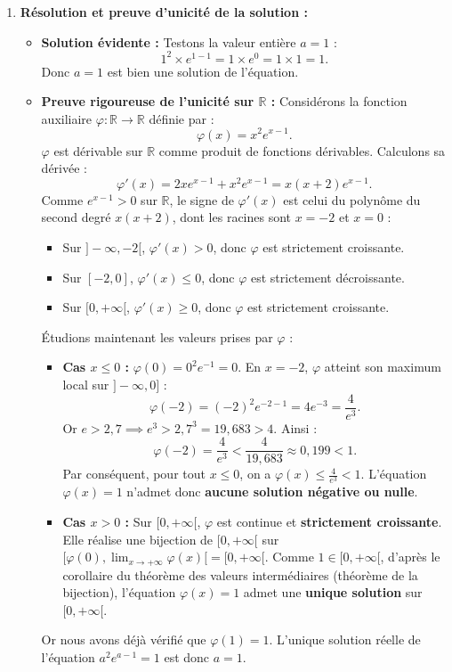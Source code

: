 \documentclass[11pt,a4paper]{article}
\newcommand{\R}{\mathbb{R}}
\begin{document}
\begin{correctionbox}[Exercice 5]
\begin{enumerate}[label=\textbf{\arabic*.}]
    \item \textbf{Résolution et preuve d'unicité de la solution :}
    \begin{itemize}
        \item \textbf{Solution évidente :}
        Testons la valeur entière $a = 1$ :
        \[
        1^2 \times e^{1-1} = 1 \times e^0 = 1 \times 1 = 1.
        \]
        Donc $a = 1$ est bien une solution de l'équation.
        \item \textbf{Preuve rigoureuse de l'unicité sur $\R$ :}
        Considérons la fonction auxiliaire $\varphi : \R \to \R$ définie par :
        \[
        \varphi(x) = x^2 e^{x-1}.
        \]
        $\varphi$ est dérivable sur $\R$ comme produit de fonctions dérivables. Calculons sa dérivée :
        \[
        \varphi'(x) = 2x e^{x-1} + x^2 e^{x-1} = x(x+2)e^{x-1}.
        \]
        Comme $e^{x-1} > 0$ sur $\R$, le signe de $\varphi'(x)$ est celui du polynôme du second degré $x(x+2)$, dont les racines sont $x = -2$ et $x = 0$ :
        \begin{itemize}
            \item Sur $]-\infty, -2[$, $\varphi'(x) > 0$, donc $\varphi$ est strictement croissante.
            \item Sur $[-2, 0]$, $\varphi'(x) \le 0$, donc $\varphi$ est strictement décroissante.
            \item Sur $[0, +\infty[$, $\varphi'(x) \ge 0$, donc $\varphi$ est strictement croissante.
        \end{itemize}
        Étudions maintenant les valeurs prises par $\varphi$ :
        \begin{itemize}
            \item \textbf{Cas $x \le 0$ :}
            $\varphi(0) = 0^2 e^{-1} = 0$.
            En $x = -2$, $\varphi$ atteint son maximum local sur $]-\infty, 0]$ :
            \[
            \varphi(-2) = (-2)^2 e^{-2-1} = 4e^{-3} = \frac{4}{e^3}.
            \]
            Or $e > 2{,}7 \implies e^3 > 2{,}7^3 = 19{,}683 > 4$. Ainsi :
            \[
            \varphi(-2) = \frac{4}{e^3} < \frac{4}{19{,}683} \approx 0{,}199 < 1.
            \]
            Par conséquent, pour tout $x \le 0$, on a $\varphi(x) \le \frac{4}{e^3} < 1$. L'équation $\varphi(x) = 1$ n'admet donc \textbf{aucune solution négative ou nulle}.
            \item \textbf{Cas $x > 0$ :}
            Sur $[0, +\infty[$, $\varphi$ est continue et \textbf{strictement croissante}.
            Elle réalise une bijection de $[0, +\infty[$ sur $[\varphi(0), \lim_{x \to +\infty} \varphi(x)[ = [0, +\infty[$.
            Comme $1 \in [0, +\infty[$, d'après le corollaire du théorème des valeurs intermédiaires (théorème de la bijection), l'équation $\varphi(x) = 1$ admet une \textbf{unique solution} sur $[0, +\infty[$.
        \end{itemize}
        Or nous avons déjà vérifié que $\varphi(1) = 1$.
        L'unique solution réelle de l'équation $a^2 e^{a-1} = 1$ est donc $\boxed{a = 1}$.
    \end{itemize}


\end{enumerate}
\end{correctionbox}
\end{document}

